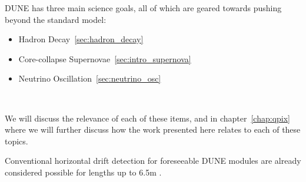 DUNE has three main science goals, all of which are geared towards pushing beyond the standard model:
\begin{itemize}
    \item Hadron Decay~\ref{sec:hadron_decay}
    \item Core-collapse Supernovae~\ref{sec:intro_supernova}
    \item Neutrino Oscillation~\ref{sec:neutrino_osc}
\end{itemize}
~\label{item:dune_props}

We will discuss the relevance of each of these items, and in chapter~\ref{chap:qpix} where we will further discuss how the work presented here relates to each of these topics.

Conventional horizontal drift detection for foreseeable DUNE modules are already considered possible for lengths up to 6.5m \citep{DUNE_Vertical:Paulucci_2022}.
